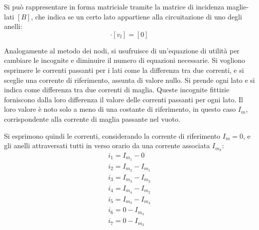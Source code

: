 \documentclass{article}
\numberwithin{equation}{subsection}
\begin{document}
Si può rappresentare in forma matriciale tramite la matrice di incidenza maglie-lati $[B]$, che  indica se un certo lato appartiene alla circuitazione di uno degli anelli:
\begin{equation*}
    [B]\cdot[v_l]=[0]
\end{equation*}


Analogamente al metodo dei nodi, si usufruisce di un'equazione di utilità per cambiare le incognite e diminuire il numero di equazioni necessarie. Si vogliono esprimere 
le correnti passanti per i lati come la differenza tra due correnti, e si sceglie una corrente di riferimento, assunta di valore nullo. Si prende ogni lato e si indica come 
differenza tra due correnti di maglia. Queste incognite fittizie forniscono dalla loro differenza il valore delle correnti passanti per ogni lato. Il loro valore è noto 
solo a meno di una costante di riferimento, in questo caso $I_m$, corrispondente alla corrente di maglia passante nel vuoto. 

Si esprimono quindi le correnti, considerando la corrente di riferimento $I_m=0$, e gli anelli attraversati tutti in verso orario da una corrente associata $I_{m_k}$:
\begin{gather*}
    i_1=I_{m_1}-0\\
    i_2=I_{m_2}-I_{m_1}\\
    i_3=I_{m_3}-I_{m_2}\\
    i_4=I_{m_4}-I_{m_2}\\
    i_5=I_{m_3}-I_{m_4}\\
    i_6=0-I_{m_4}\\
    i_7=0-I_{m_3}
\end{gather*}
\end{document}
